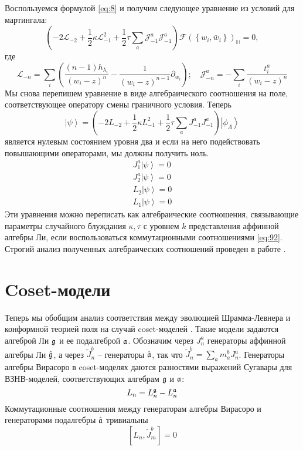 Воспользуемся формулой \eqref{eq:8} и получим следующее уравнение из условий для мартингала:
\begin{equation}
  \left(-2 \mathcal{L}_{-2}+\frac{1}{2}\kappa \mathcal{L}_{-1}^{2}+\frac{1}{2}\tau\sum_{a} \mathcal{J}^{a}_{-1} \mathcal{J}^{a}_{-1}\right)        \mathcal{F}(\left\{w_{i}, \bar w_{i}\right\})_{\mathbb{H}}=0,
  \label{eq:27}
\end{equation}
где
\begin{equation*}
  \mathcal{L}_{-n}=\sum_{i}\left(\frac{(n-1)h_{\lambda_{i}}}{(w_{i}-z)^{n}}-\frac{1}{(w_{i}-z)^{n-1}}\partial_{w_{i}}\right);\quad \mathcal{J}^{a}_{{-n}}=-\sum_{i}\frac{t^{a}_{i}}{(w_{i}-z)^{n}}
\end{equation*}
Мы снова перепишем уравнение в виде алгебраического соотношения на поле, соответствующее оператору смены граничного условия. Теперь
\begin{equation}
  \left| \psi\right>=\left(-2 L_{-2}+\frac{1}{2}\kappa L_{-1}^{2}+\frac{1}{2}\tau\sum_{a} J^{a}_{-1} J^{a}_{-1}\right) \left|\phi_{\Lambda}\right>    
  \label{eq:16}
\end{equation}
является нулевым состоянием уровня два и если на него подействовать повышающими операторами, мы должны получить ноль.
\begin{eqnarray}
  J^{a}_{1} \left|\psi\right>=0\\
  J^{a}_{2}\left|\psi\right>=0\\
  L_{2}\left|\psi\right>=0\\
  L_{1}\left|\psi\right>=0
\end{eqnarray}
Эти уравнения можно переписать как алгебраические соотношения, связывающие параметры случайного блуждания $\kappa, \tau$ с уровнем  $k$ представления аффинной алгебры Ли, если воспользоваться коммутационными соотношениями  \eqref{eq:92}. Строгий анализ полученных алгебраических соотношений проведен в работе \cite{alekseev2010sle}.

\section{Coset-модели}
\label{sec:coset-models}
Теперь мы обобщим анализ соответствия между эволюцией Шрамма-Левнера и конформной теорией поля на случай coset-моделей \cite{Goddard198588}. Такие модели задаются алгеброй Ли $\mathfrak{g}$ и ее подалгеброй $\mathfrak{a}$. Обозначим через $J_{n}^{a}$ генераторы аффинной алгебры Ли $\hat{\mathfrak{g}}$, а через $\tilde{J}_{n}^{b}$ -- генераторы $\hat{\mathfrak{a}}$, так что $\tilde{J}^{b}_{n}=\sum_{a} m_{a}^{b} J^{a}_{n}$. Генераторы алгебры Вирасоро в coset-моделях даются разностями выражений Сугавары для ВЗНВ-моделей, соответствующих алгебрам  $\mathfrak{g}$ и $\mathfrak{a}$:
\begin{equation*}
  L_{n}=L_{n}^{\mathfrak{g}}-L_{n}^{\mathfrak{a}}
\end{equation*}
Коммутационные соотношения между генераторам алгебры Вирасоро и генераторами подалгебры  $\hat{\mathfrak{a}}$ тривиальны
\begin{equation}
  \label{eq:26}
  \left[L_{n},\tilde{J}^{b}_{m}\right]=0
\end{equation}

